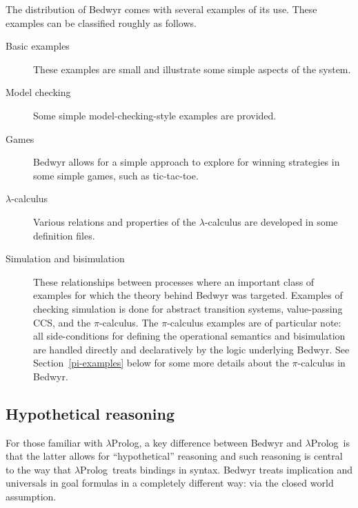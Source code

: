 \documentclass{article}
\newcommand{\lp}{$\lambda$Prolog}
\begin{document}
The distribution of Bedwyr comes with several examples of its use.
These examples can be classified roughly as follows.

\begin{description}
\item[Basic examples] These examples are small and illustrate some
  simple aspects of the system.

\item[Model checking] Some simple model-checking-style examples are
  provided.

\item[Games] Bedwyr allows for a simple approach to explore for
  winning strategies in some simple games, such as tic-tac-toe.

\item[$\lambda$-calculus] Various relations and properties of the
  $\lambda$-calculus are developed in some definition files.

\item[Simulation and bisimulation] These relationships between
  processes where an important class of examples for which the theory
  behind Bedwyr was targeted.  Examples of checking simulation is done
  for abstract transition systems, value-passing CCS, and the
  $\pi$-calculus.  The $\pi$-calculus examples are of particular note:
  all side-conditions for defining the operational semantics and
  bisimulation are handled directly and declaratively by the logic
  underlying Bedwyr.  See Section~\ref{pi-examples} below for some more
  details about the $\pi$-calculus in Bedwyr.

\end{description}

\subsection{Hypothetical reasoning}

For those familiar with \lp, a key difference between
Bedwyr and \lp\ is that the latter allows for ``hypothetical''
reasoning and such reasoning is central to the way that \lp\ treats
bindings in syntax.    Bedwyr treats implication and universals in
goal formulas in a completely different way: via the closed world
assumption.
\end{document}
